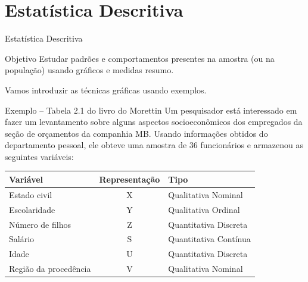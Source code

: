 \documentclass[9pt]{beamer}
\begin{document}
\begin{frame}{}
 \begin{figure}
  \centering
 \end{figure}
\end{frame}

\section{Estatística Descritiva}

\begin{frame}{Estatística Descritiva}
\begin{block}{Objetivo}
	Estudar padrões e comportamentos presentes na amostra (ou na população) usando gráficos e medidas resumo.
\end{block}

Vamos introduzir as técnicas gráficas usando exemplos.

\begin{block}{Exemplo -- Tabela 2.1 do livro do Morettin}
	Um pesquisador está interessado em fazer um levantamento sobre alguns aspectos socioeconômicos dos empregados da seção de orçamentos da companhia MB. Usando informações obtidos do departamento 
	pessoal, ele obteve uma amostra de 36 funcionários e armazenou as seguintes variáveis:
	\begin{table}
		\centering
		\begin{tabular}{lcl}
			\toprule[0.05cm]
			Variável & Representação & Tipo\\
			\midrule[0.05cm]
			Estado civil & X & Qualitativa Nominal\\
			Escolaridade & Y & Qualitativa Ordinal\\
			Número de filhos & Z & Quantitativa Discreta\\
			Salário & S & Quantitativa Contínua\\
			Idade & U & Quantitativa Discreta\\
			Região da procedência & V & Qualitativa Nominal\\ \bottomrule[0.05cm]
		\end{tabular}
	\end{table}
\end{block} 
\end{frame}
\end{document}
